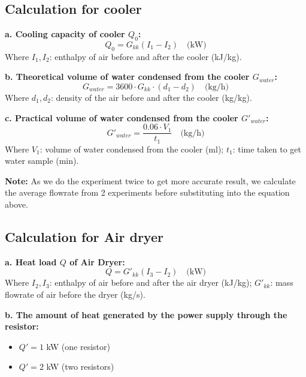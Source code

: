 \subsection{Calculation for cooler}
\textbf{a. Cooling capacity of cooler $Q_0$:}
\begin{equation}
    Q_0 = G_{kk} (I_1 - I_2) \quad \text{(kW)}
\end{equation}
Where $I_1, I_2$: enthalpy of air before and after the cooler (kJ/kg).

\vspace{0.3cm}
\textbf{b. Theoretical volume of water condensed from the cooler $G_{water}$:}
\begin{equation}
    G_{water} = 3600 \cdot G_{kk} \cdot (d_1 - d_2) \quad \text{(kg/h)}
\end{equation}
Where $d_1, d_2$: density of the air before and after the cooler (kg/kg).

\vspace{0.3cm}
\textbf{c. Practical volume of water condensed from the cooler $G'_{water}$:}
\begin{equation}
    G'_{water} = \frac{0.06 \cdot V_1}{t_1} \quad \text{(kg/h)}
\end{equation}
Where $V_1$: volume of water condensed from the cooler (ml); $t_1$: time taken to get water sample (min).

\vspace{0.3cm}
\noindent \textbf{Note:} As we do the experiment twice to get more accurate result, we calculate the average flowrate from 2 experiments before substituting into the equation above.

\subsection{Calculation for Air dryer}
\textbf{a. Heat load $Q$ of Air Dryer:}
\begin{equation}
    Q = G'_{kk} (I_3 - I_2) \quad \text{(kW)}
\end{equation}
Where $I_2, I_3$: enthalpy of air before and after the air dryer (kJ/kg); $G'_{kk}$: mass flowrate of air before the dryer (kg/s).

\vspace{0.3cm}
\textbf{b. The amount of heat generated by the power supply through the resistor:}
\begin{itemize}
    \item $Q' = 1$ kW (one resistor)
    \item $Q' = 2$ kW (two resistors)
\end{itemize}
